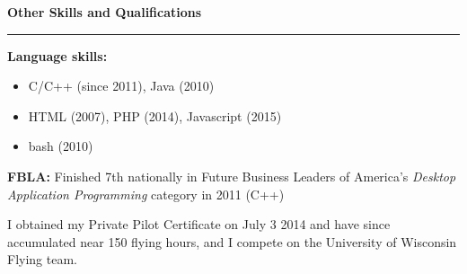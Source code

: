 \documentclass[12pt,letterpaper]{article}
\newenvironment{details}{
    \vspace{-.5em}
    \begin{itemize}
        \renewcommand \labelitemi{\labelitemiv}
        \setlength{\itemsep}{0pt}
        \setlength{\parskip}{-1pt}
        \setlength{\parsep}{0pt}
    }{
    \end{itemize}
    \vspace{-.5em}
}
\newcommand{\hr} {
    \vspace{-1em}
    \par\rule{\textwidth}{1pt}
    \vspace{-1.5em}
}
\newcommand{\ressection}[1] {
    \par{\large \textbf{#1}}
    \hr
}
\newenvironment{other} {
    \ressection{Other Skills and Qualifications}
    \setlength{\parskip}{3pt}
}{
    \vspace{0.5em}
}
\begin{document}
\begin{other}
\par \textbf{Language skills:}
\begin{details}
    \item C/C++ (since 2011), Java (2010)
    \item HTML (2007), PHP (2014), Javascript (2015)
    \item bash (2010)
\end{details}
\par \textbf{FBLA:} Finished 7th nationally in Future Business Leaders of America's \textit{Desktop Application Programming} category in 2011 (C++)


\par I obtained my Private Pilot Certificate on July 3 2014 and have since accumulated near 150 flying hours, and I compete on the University of Wisconsin Flying team.

\end{other}
\end{document}
